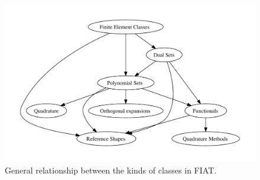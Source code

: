 \begin{figure}
  \center
  \includegraphics[width=\largefig]{chapters/kirby-2/pdf/struct.pdf}
  \caption{General relationship between the kinds of classes in FIAT.}
  \label{fig:struct}
\end{figure}

